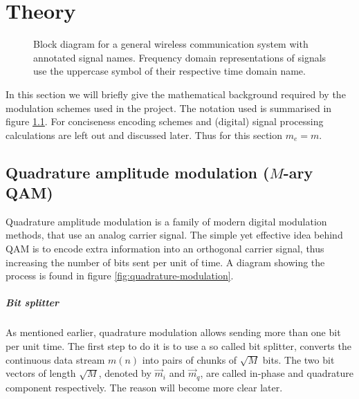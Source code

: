 
\chapter{Theory}

\begin{figure}
	\centering
	
	\caption{
		Block diagram for a general wireless communication system with annotated signal names. Frequency domain representations of signals use the uppercase symbol of their respective time domain name.
		\label{fig:notation}
	}
\end{figure}

In this section we will briefly give the mathematical background required by the modulation schemes used in the project. The notation used is summarised in figure \ref{fig:notation}. For conciseness encoding schemes and (digital) signal processing calculations are left out and discussed later. Thus for this section \(m_e = m\).


\section{Quadrature amplitude modulation (\(M\)-ary QAM)}

Quadrature amplitude modulation is a family of modern digital modulation methods, that use an analog carrier signal. The simple yet effective idea behind QAM is to encode extra information into an orthogonal carrier signal, thus increasing the number of bits sent per unit of time. A diagram showing the process is found in figure \ref{fig:quadrature-modulation}.


\paragraph{Bit splitter}

As mentioned earlier, quadrature modulation allows sending more than one bit per unit time. The first step to do it is to use a so called bit splitter, converts the continuous data stream \(m(n)\) into pairs of chunks of \(\sqrt{M}\) bits. The two bit vectors of length \(\sqrt{M}\), denoted by \(\vec{m}_i\) and \(\vec{m}_q\), are called in-phase and quadrature component respectively. The reason will become more clear later.

